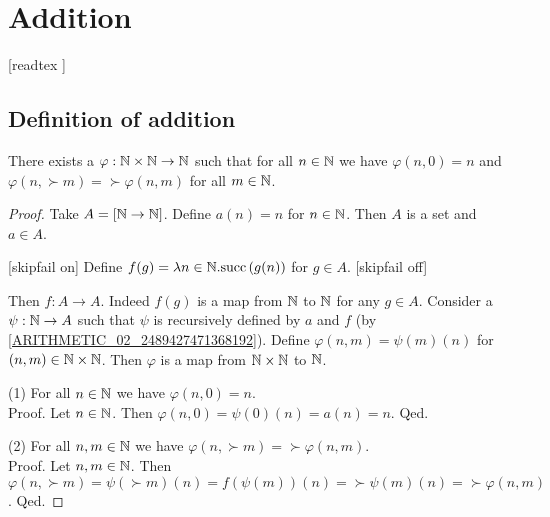 \documentclass[../arithmetic.tex]{subfiles}
\begin{document}
  \chapter{Addition}\label{chapter:addition}


  \begin{forthel}

    [readtex ]

  \end{forthel}


  \section{Definition of addition}

  \begin{forthel}
    \begin{lemma}
      There exists a $\varphi : \mathbb{N} \times \mathbb{N} \to \mathbb{N}$ such
      that for all $n \in \mathbb{N}$ we have $\varphi(n,0) = n$ and
      $\varphi(n,\succ{m}) = \succ{\varphi(n,m)}$ for all $m \in \mathbb{N}$.
    \end{lemma}
    \begin{proof}
      Take $A = [\mathbb{N}\to\mathbb{N}]$.
      Define $a(n) = n$ for $n \in \mathbb{N}$.
      Then $A$ is a set and $a \in A$.

      [skipfail on] %
      Define $f(g) = \mathrm{\lambda} n \in \mathbb{N}. \mathrm{succ}\left(g(n)\right)$ for $g \in A$.
      [skipfail off]

      Then $f : A \to A$.
      Indeed $f(g)$ is a map from $\mathbb{N}$ to $\mathbb{N}$ for any $g \in A$.
      Consider a $\psi : \mathbb{N} \to A$ such that $\psi$ is recursively defined by
      $a$ and $f$ (by \cref{ARITHMETIC_02_2489427471368192}).
      Define $\varphi(n,m) = \psi(m)(n)$ for $(n,m) \in \mathbb{N} \times \mathbb{N}$.
      Then $\varphi$ is a map from $\mathbb{N} \times \mathbb{N}$ to $\mathbb{N}$.

      (1) For all $n \in \mathbb{N}$ we have $\varphi(n,0) = n$. \\
      Proof.
        Let $n \in \mathbb{N}$.
        Then $\varphi(n,0)
          = \psi(0)(n)
          = a(n)
          = n$.
      Qed.

      (2) For all $n, m \in \mathbb{N}$ we have $\varphi(n, \succ{m}) =
      \succ{\varphi(n,m)}$. \\
      Proof.
        Let $n, m \in \mathbb{N}$.
        Then $\varphi(n, \succ{m})
          = \psi(\succ{m})(n)
          = f(\psi(m))(n)
          = \succ{\psi(m)(n)}
          = \succ{\varphi(n,m)}$.
      Qed.
    \end{proof}
  \end{forthel}
\end{document}
